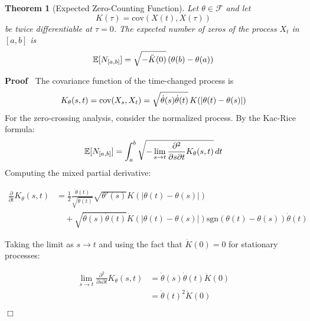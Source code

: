 \documentclass{article}
\newenvironment{proof}{\noindent\textbf{Proof\ }}{\hspace*{\fill}$\Box$\medskip}
\newtheorem{theorem}{Theorem}
\begin{document}
\begin{theorem}
  [Expected Zero-Counting Function]\label{thm:zero_count} Let $\theta \in
  \mathcal{F}$ and let
  \begin{equation}
    K (\tau) = \mathrm{cov} (X (t), X (\tau))
  \end{equation}
  be twice differentiable at $\tau = 0$. The expected number of zeros of the
  process $X_t$ in $[a, b]$ is
  \begin{equation}
    \label{eq:zero_count} \mathbb{E} [N_{[a, b]}] = \sqrt{- \ddot{K} (0)} 
    \hspace{0.17em} (\theta (b) - \theta (a))
  \end{equation}
\end{theorem}

\begin{proof}
  The covariance function of the time-changed process is
  \begin{equation}
    \label{eq:time_changed_cov} K_{\theta} (s, t) = \mathrm{cov} (X_s, X_t) =
    \sqrt{\dot{\theta} (s)  \dot{\theta} (t)}  \hspace{0.17em} K (| \theta (t)
    - \theta (s) |)
  \end{equation}
  For the zero-crossing analysis, consider the normalized process. By the
  Kac-Rice formula:
  \begin{equation}
    \label{eq:kac_rice} \mathbb{E} [N_{[a, b]}] = \int_a^b \sqrt{- \lim_{s \to
    t}  \frac{\partial^2}{\partial s \partial t} K_{\theta} (s, t)} 
    \hspace{0.17em} dt
  \end{equation}
  Computing the mixed partial derivative:
  
  \begin{align}
    \frac{\partial}{\partial t} K_{\theta} (s, t) & = \frac{1}{2} 
    \frac{\ddot{\theta} (t)}{\sqrt{\dot{\theta} (t)}}  \sqrt{\theta' (s)} K (|
    \theta (t) - \theta (s) |) \\
    & \quad + \sqrt{\dot{\theta} (s)  \dot{\theta} (t)}  \dot{K} (| \theta
    (t) - \theta (s) |) \mathrm{sgn} (\theta (t) - \theta (s))  \dot{\theta}
    (t) 
  \end{align}
  
  Taking the limit as $s \to t$ and using the fact that $\dot{K} (0) = 0$ for
  stationary processes:
  
  \begin{align}
    \lim_{s \to t}  \frac{\partial^2}{\partial s \partial t} K_{\theta} (s, t)
    & = \dot{\theta} (s)  \dot{\theta} (t)  \ddot{K} (0) \\
    & = \dot{\theta} (t)^2  \ddot{K} (0) 
  \end{align}
  

\end{proof}
\end{document}

